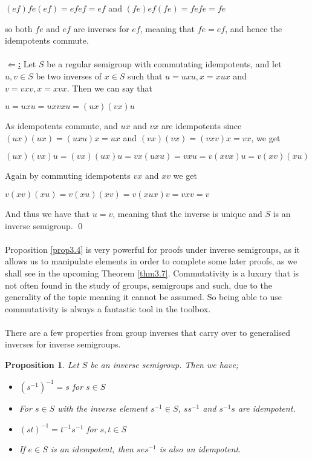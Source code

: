 \documentclass[12pt]{article}
\newtheorem{prop}[theorem]{Proposition}
\begin{document}
		\begin{center}
			$(ef)fe(ef)=efef=ef$	and	$(fe)ef(fe)=fefe=fe$
		\end{center}
		so both $fe$ and $ef$ are inverses for $ef$, meaning that $fe=ef$, and hence the idempotents commute.\\
	\\\textbf{\underline{$\Leftarrow$:}}
		Let $S$ be a regular semigroup with commutating idempotents, and let $u,v \in S$ be two inverses of $x \in S$ such that $u = uxu, x=xux$ and $v=vxv, x=xvx$. Then we can say that
		\begin{center}
			$u=uxu=uxvxu=(ux)(vx)u$
		\end{center}
		As idempotents commute, and $ux$ and $vx$ are idempotents since $(ux)(ux)=(uxu)x=ux$ and $(vx)(vx)=(vxv)x=vx$, we get
		\begin{center}
			$(ux)(vx)u=(vx)(ux)u=vx(uxu)=vxu=v(xvx)u=v(xv)(xu)$
		\end{center}
		Again by commuting idempotents $vx$ and $xv$ we get
		\begin{center}
			$v(xv)(xu)=v(xu)(xv)=v(xux)v=vxv=v$
		\end{center}
		And thus we have that $u=v$, meaning that the inverse is unique and $S$ is an inverse semigroup.
	\qed\\
\\Proposition \ref{prop3.4} is very powerful for proofs under inverse semigroups, as it allows us to manipulate elements in order to complete some later proofs, as we shall see in the upcoming Theorem \ref{thm3.7}. Commutativity is a luxury that is not often found in the study of groups, semigroups and such, due to the generality of the topic meaning it cannot be assumed. So being able to use commutativity is always a fantastic tool in the toolbox.\\
\\There are a few properties from group inverses that carry over to generalised inverses for inverse semigroups. 
\begin{prop}\label{inverseprop}
Let $S$ be an inverse semigroup. Then we have;
	\begin{itemize}
		\item[\textbf{(a)}] $(s^{-1})^{-1} = s$ for $s \in S$
		\item[\textbf{(b)}] For $s \in S$ with the inverse element $s^{-1} \in S$, $ss^{-1}$ and $s^{-1}s$ are idempotent.
		\item[\textbf{(c)}] $(st)^{-1} = t^{-1}s^{-1}$ for $s,t \in S$
		\item[\textbf{(d)}] If $e \in S$ is an idempotent, then $ses^{-1}$ is also an idempotent.
	\end{itemize}
\end{prop}
\end{document}
